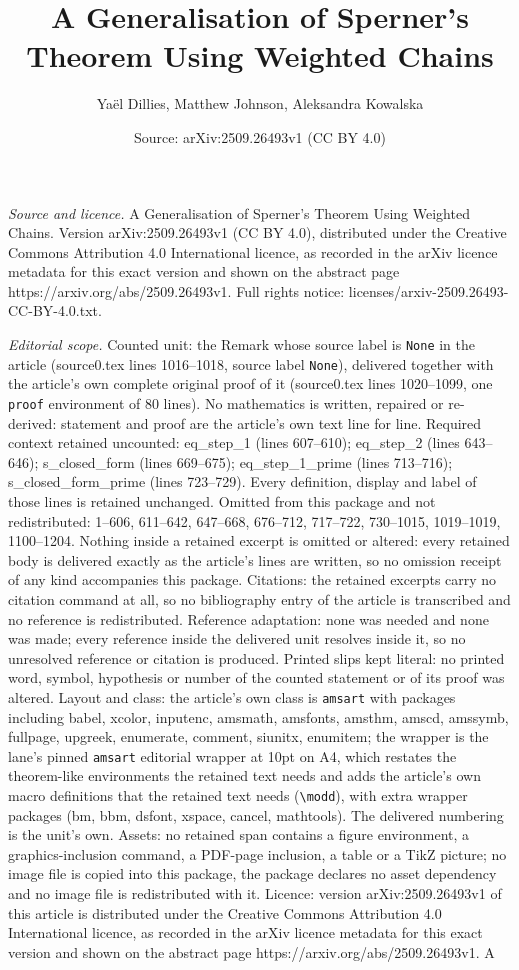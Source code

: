 \documentclass[10pt,a4paper]{amsart}
\title[A Generalisation of Sperner's Theorem Using Weighted Chains]{A Generalisation of Sperner's Theorem Using Weighted Chains}
\author{Ya\"el Dillies, Matthew Johnson, Aleksandra Kowalska}
\date{Source: arXiv:2509.26493v1 (CC BY 4.0)}
\begin{document}
\maketitle

\noindent\emph{Source and licence.} A Generalisation of Sperner's Theorem Using Weighted Chains. Version arXiv:2509.26493v1 (CC BY 4.0), distributed under the Creative Commons Attribution 4.0 International licence, as recorded in the arXiv licence metadata for this exact version and shown on the abstract page https://arxiv.org/abs/2509.26493v1. Full rights notice: licenses/arxiv-2509.26493-CC-BY-4.0.txt.\par\smallskip

\noindent\textit{Editorial scope.} Counted unit: the Remark whose source label is \texttt{None} in the article (source0.tex lines 1016--1018, source label \texttt{None}), delivered together with the article's own complete original proof of it (source0.tex lines 1020--1099, one \texttt{proof} environment of 80 lines). No mathematics is written, repaired or re-derived: statement and proof are the article's own text line for line. Required context retained uncounted: eq\_step\_1 (lines 607--610); eq\_step\_2 (lines 643--646); s\_closed\_form (lines 669--675); eq\_step\_1\_prime (lines 713--716); s\_closed\_form\_prime (lines 723--729). Every definition, display and label of those lines is retained unchanged. Omitted from this package and not redistributed: 1--606, 611--642, 647--668, 676--712, 717--722, 730--1015, 1019--1019, 1100--1204. Nothing inside a retained excerpt is omitted or altered: every retained body is delivered exactly as the article's lines are written, so no omission receipt of any kind accompanies this package. Citations: the retained excerpts carry no citation command at all, so no bibliography entry of the article is transcribed and no reference is redistributed. Reference adaptation: none was needed and none was made; every reference inside the delivered unit resolves inside it, so no unresolved reference or citation is produced. Printed slips kept literal: no printed word, symbol, hypothesis or number of the counted statement or of its proof was altered. Layout and class: the article's own class is \texttt{amsart} with packages including babel, xcolor, inputenc, amsmath, amsfonts, amsthm, amscd, amssymb, fullpage, upgreek, enumerate, comment, siunitx, enumitem; the wrapper is the lane's pinned \texttt{amsart} editorial wrapper at 10pt on A4, which restates the theorem-like environments the retained text needs and adds the article's own macro definitions that the retained text needs (\texttt{\textbackslash modd}), with extra wrapper packages (bm, bbm, dsfont, xspace, cancel, mathtools). The delivered numbering is the unit's own. Assets: no retained span contains a figure environment, a graphics-inclusion command, a PDF-page inclusion, a table or a TikZ picture; no image file is copied into this package, the package declares no asset dependency and no image file is redistributed with it. Licence: version arXiv:2509.26493v1 of this article is distributed under the Creative Commons Attribution 4.0 International licence, as recorded in the arXiv licence metadata for this exact version and shown on the abstract page https://arxiv.org/abs/2509.26493v1. A 
\end{document}
